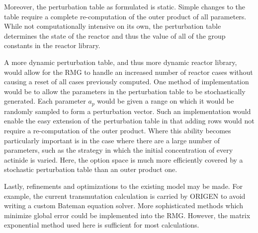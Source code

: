 Moreover, the perturbation table as formulated is static.  Simple changes to the table
require a complete re-computation of the outer product of all parameters.  While not computationally
intensive on its own, the perturbation table determines the state of the reactor and thus the 
value of all of the group constants in the reactor library.  

A more dynamic perturbation table, and thus more dynamic reactor library, would allow for the RMG to 
handle an increased number of reactor cases without causing a reset of all cases previously computed.
One method of implementation would be to allow the parameters in the perturbation table to be stochastically
generated.  Each parameter $a_p$ would be given a range on which it would be randomly sampled to form a 
perturbation vector.  Such an implementation would enable the easy extension of the perturbation 
table in that adding rows would not require a re-computation of the outer product.  
Where this ability becomes particularly important is in the case 
where there are a large number of parameters, such as the strategy in which the initial concentration of 
every actinide is varied.  Here, the option space is much more efficiently covered by a stochastic 
perturbation table than an outer product one.

Lastly, refinements and optimizations to the existing model may be made.  For example, the current 
transmutation calculation is carried by ORIGEN to avoid writing a custom Bateman equation solver.  
More sophisticated methods which minimize global error 
could be implemented into the RMG.  However, the matrix exponential method used here is 
sufficient for most calculations.
